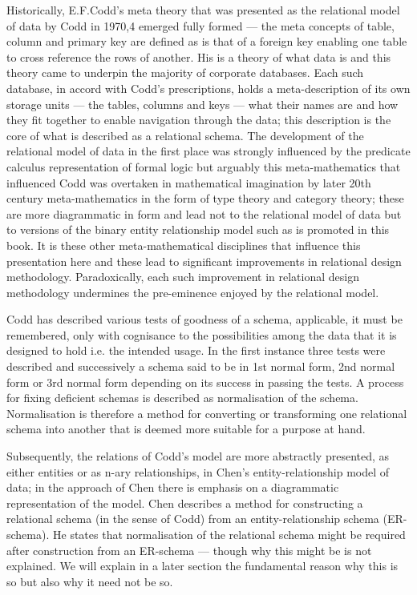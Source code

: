 \mynote Historically, E.F.Codd's meta theory that was presented as the relational model of data by Codd in 1970,4 emerged fully formed — the meta concepts of table, column and primary key are defined as is that of a foreign key enabling one table to cross reference the rows of another. His is a theory of what data is and this theory came to underpin the majority of corporate databases. Each such database, in accord with Codd's prescriptions, holds a meta-description of its own storage units — the tables, columns and keys — what their names are and how they fit together to enable navigation through the data; this description is the core of what is described as a relational schema. The development of the relational model of data in the first place was strongly influenced by the predicate calculus representation of formal logic but arguably this meta-mathematics that influenced Codd was overtaken in mathematical imagination by later 20th century meta-mathematics in the form of type theory and category theory; these are more diagrammatic in form and lead not to the relational model of data but to versions of the binary entity relationship model such as is promoted in this book. It is these other meta-mathematical disciplines that influence this presentation here and these lead to significant improvements in relational design methodology. Paradoxically, each such improvement in relational design methodology undermines the pre-eminence enjoyed by the relational model.

\mynote Codd has described various tests of goodness of a schema, applicable, it must be remembered, only with cognisance to the possibilities among the data that it is designed to hold i.e. the intended usage. In the first instance three tests were described and successively a schema said to be in 1st normal form, 2nd normal form or 3rd normal form depending on its success in passing the tests. A process for fixing deficient schemas is described as normalisation of the schema. Normalisation is therefore a method for converting or transforming one relational schema into another that is deemed more suitable for a purpose at hand.

\mynote Subsequently, the relations of Codd's model are more abstractly presented, as either entities or as n-ary relationships, in Chen's entity-relationship model of data; in the approach of Chen there is emphasis on a diagrammatic representation of the model. Chen describes a method for constructing a relational schema (in the sense of Codd) from an entity-relationship schema (ER-schema). He states that normalisation of the relational schema might be required after construction from an ER-schema — though why this might be is not explained. We will explain in a later section the fundamental reason why this is so but also why it need not be so.

